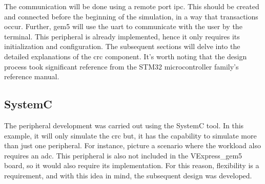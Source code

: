 The communication will be done using a remote port \gls{ipc}. This should be created and connected before the beginning of the
simulation, in a way that transactions occur. Further, gem5 will use the \gls{uart} to communicate with the user by the terminal. 
This peripheral is already implemented, hence it only requires its initialization and configuration. The subsequent sections will delve into 
the detailed explanations of the \gls{crc} component. It's worth noting that the design process 
took significant reference from the STM32 microcontroller family's reference manual.


\subsection{SystemC}

The peripheral development was carried out using the SystemC tool. In this example, it will only simulate the \gls{crc} but, it has
the capability to simulate more than just one peripheral. For instance, picture a scenario where the workload also requires an \gls{adc}.
This peripheral is also not included in the VExpress\_gem5 board, so it would also require its implementation. For this reason, flexibility
is a requirement, and with this idea in mind, the subsequent design was developed.

